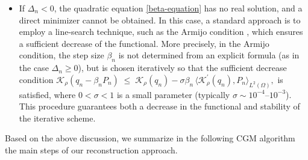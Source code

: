 \documentclass[a4paper,12pt,reqno,natbib]{amsart}
\begin{document}
{\begin{itemize}
\begin{itemize}
\item[-] Otherwise,
$
\beta_{n}=\beta_n^2. 
$
\end{itemize}
\item If $\Delta_n < 0$, the quadratic equation \eqref{beta-equation} has no real solution, and a direct minimizer cannot be obtained. 
In this case, a standard approach is to employ a line-search technique, such as the Armijo condition \cite{armijo1966minimization}, 
which ensures a sufficient decrease of the functional. More precisely, in the Armijo condition, the step size $\beta_n$ is not determined from an explicit formula (as in the case $\Delta_n \geq 0$), 
but is chosen iteratively so that the sufficient decrease condition
$\mathcal{K}_\rho(q_n - \beta_n P_n) 
   \;\leq\; \mathcal{K}_\rho(q_n) 
   - \sigma \beta_n \,\langle \mathcal{K}_\rho^\prime(q_n), P_n \rangle_{L^2(\Omega)},$
is satisfied, where $0<\sigma<1$ is a small parameter (typically $\sigma \sim 10^{-4}$--$10^{-3}$). 
This procedure guarantees both a decrease in the functional and stability of the iterative scheme.
\end{itemize}

Based on the above discussion, we summarize in the following CGM algorithm the main steps of our reconstruction approach.

\begin{algorithm}[H]\label{algo1}
\caption{The CGM for solving the optimization problem \eqref{stable}}\label{alg:CG}
\end{algorithm}}
\end{document}
